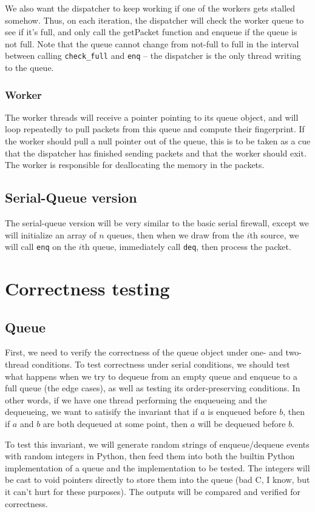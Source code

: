 \documentclass{article}
\begin{document}
We also want the dispatcher to keep working if one of the workers gets stalled somehow. Thus, on each iteration, the dispatcher will check the worker queue to see if it's full, and only call the getPacket function and enqueue if the queue is not full. Note that the queue cannot change from not-full to full in the interval between calling \verb|check_full| and \verb|enq| -- the dispatcher is the only thread writing to the queue.
\subsubsection*{Worker}
The worker threads will receive a pointer pointing to its queue object, and will loop repeatedly to pull packets from this queue and compute their fingerprint. If the worker should pull a null pointer out of the queue, this is to be taken as a cue that the dispatcher has finished sending packets and that the worker should exit. The worker is responsible for deallocating the memory in the packets. 
\subsection*{Serial-Queue version}
The serial-queue version will be very similar to the basic serial firewall, except we will initialize an array of $n$ queues, then when we draw from the $i$th source, we will call \verb|enq| on the $i$th queue, immediately call \verb|deq|, then process the packet. 
\section*{Correctness testing}
\subsection*{Queue}
First, we need to verify the correctness of the queue object under one- and two-thread conditions. To test correctness under serial conditions, we should test what happens when we try to dequeue from an empty queue and enqueue to a full queue (the edge cases), as well as testing its order-preserving conditions. In other words, if we have one thread performing the enqueueing and the dequeueing, we want to satisify the invariant that if $a$ is enqueued before $b$, then if $a$ and $b$ are both dequeued at some point, then $a$ will be dequeued before $b$.

To test this invariant, we will generate random strings of enqueue/dequeue events with random integers in Python, then feed them into both the builtin Python implementation of a queue and the implementation to be tested. The integers will be cast to void pointers directly to store them into the queue (bad C, I know, but it can't hurt for these purposes). The outputs will be compared and verified for correctness.
\end{document}
